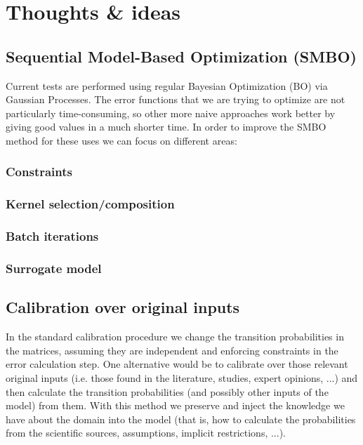 
\chapter{Thoughts \& ideas} %

\label{sec:ideas} %

\section{Sequential Model-Based Optimization (SMBO)}
Current tests are performed using regular Bayesian Optimization (BO) via Gaussian Processes. The error functions that we are trying to optimize are not particularly time-consuming, so other more naive approaches work better by giving good values in a much shorter time. In order to improve the SMBO method for these uses we can focus on different areas:

\subsection{Constraints}
\subsection{Kernel selection/composition}
\subsection{Batch iterations}
\subsection{Surrogate model}

\section{Calibration over original inputs}

In the standard calibration procedure we change the transition probabilities in the matrices, assuming they are independent and enforcing constraints in the error calculation step. One alternative would be to calibrate over those relevant original inputs (i.e. those found in the literature, studies, expert opinions, ...) and then calculate the transition probabilities (and possibly other inputs of the model) from them. With this method we preserve and inject the knowledge we have about the domain into the model (that is, how to calculate the probabilities from the scientific sources, assumptions, implicit restrictions, ...).

